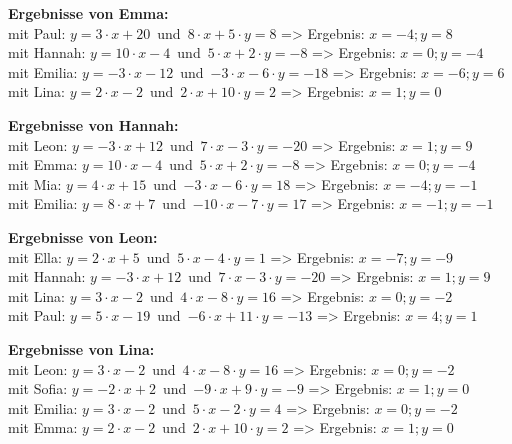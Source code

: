 \begin{minipage}{\textwidth}
\textbf{Ergebnisse von Emma:}\\
mit Paul: $y=3\cdot x+20$\mbox{ }und\mbox{ }$8\cdot x+5\cdot y=8$ => Ergebnis: $x=-4;y=8$
\\
mit Hannah: $y=10\cdot x-4$\mbox{ }und\mbox{ }$5\cdot x+2\cdot y=-8$ => Ergebnis: $x=0;y=-4$
\\
mit Emilia: $y=-3\cdot x-12$\mbox{ }und\mbox{ }$-3\cdot x-6\cdot y=-18$ => Ergebnis: $x=-6;y=6$
\\
mit Lina: $y=2\cdot x-2$\mbox{ }und\mbox{ }$2\cdot x+10\cdot y=2$ => Ergebnis: $x=1;y=0$
\\
\end{minipage}
\vspace*{3ex}

\begin{minipage}{\textwidth}
\textbf{Ergebnisse von Hannah:}\\
mit Leon: $y=-3\cdot x+12$\mbox{ }und\mbox{ }$7\cdot x-3\cdot y=-20$ => Ergebnis: $x=1;y=9$
\\
mit Emma: $y=10\cdot x-4$\mbox{ }und\mbox{ }$5\cdot x+2\cdot y=-8$ => Ergebnis: $x=0;y=-4$
\\
mit Mia: $y=4\cdot x+15$\mbox{ }und\mbox{ }$-3\cdot x-6\cdot y=18$ => Ergebnis: $x=-4;y=-1$
\\
mit Emilia: $y=8\cdot x+7$\mbox{ }und\mbox{ }$-10\cdot x-7\cdot y=17$ => Ergebnis: $x=-1;y=-1$
\\
\end{minipage}
\vspace*{3ex}

\begin{minipage}{\textwidth}
\textbf{Ergebnisse von Leon:}\\
mit Ella: $y=2\cdot x+5$\mbox{ }und\mbox{ }$5\cdot x-4\cdot y=1$ => Ergebnis: $x=-7;y=-9$
\\
mit Hannah: $y=-3\cdot x+12$\mbox{ }und\mbox{ }$7\cdot x-3\cdot y=-20$ => Ergebnis: $x=1;y=9$
\\
mit Lina: $y=3\cdot x-2$\mbox{ }und\mbox{ }$4\cdot x-8\cdot y=16$ => Ergebnis: $x=0;y=-2$
\\
mit Paul: $y=5\cdot x-19$\mbox{ }und\mbox{ }$-6\cdot x+11\cdot y=-13$ => Ergebnis: $x=4;y=1$
\\
\end{minipage}
\vspace*{3ex}

\begin{minipage}{\textwidth}
\textbf{Ergebnisse von Lina:}\\
mit Leon: $y=3\cdot x-2$\mbox{ }und\mbox{ }$4\cdot x-8\cdot y=16$ => Ergebnis: $x=0;y=-2$
\\
mit Sofia: $y=-2\cdot x+2$\mbox{ }und\mbox{ }$-9\cdot x+9\cdot y=-9$ => Ergebnis: $x=1;y=0$
\\
mit Emilia: $y=3\cdot x-2$\mbox{ }und\mbox{ }$5\cdot x-2\cdot y=4$ => Ergebnis: $x=0;y=-2$
\\
mit Emma: $y=2\cdot x-2$\mbox{ }und\mbox{ }$2\cdot x+10\cdot y=2$ => Ergebnis: $x=1;y=0$
\\
\end{minipage}
\vspace*{3ex}

